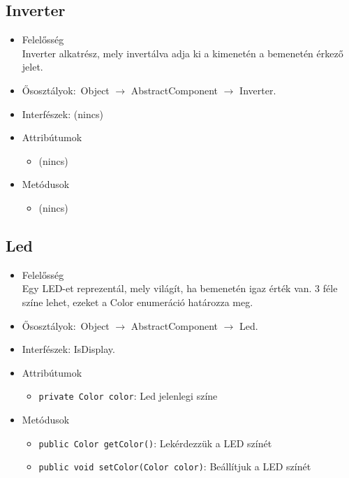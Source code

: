 \subsection{Inverter}
\begin{itemize}
\item Felelősség\\
Inverter alkatrész, mely invertálva adja ki a kimenetén a bemenetén  érkező jelet.
\item Ősosztályok:\ Object $\rightarrow{}$ AbstractComponent $\rightarrow{}$ Inverter.
\item Interfészek: (nincs)
\item Attribútumok $\ $
\begin{itemize}
\item (nincs)
\end{itemize}
\item Metódusok$\ $
\begin{itemize}
\item (nincs)
\end{itemize}
\end{itemize}

\subsection{Led}
\begin{itemize}
\item Felelősség\\
Egy LED-et reprezentál, mely világít, ha bemenetén igaz érték van.  3 féle színe lehet, ezeket a Color enumeráció határozza meg.
\item Ősosztályok:\ Object $\rightarrow{}$ AbstractComponent $\rightarrow{}$ Led.
\item Interfészek: IsDisplay.
\item Attribútumok $\ $
\begin{itemize}
	\item \texttt{private Color color}: Led jelenlegi színe
\end{itemize}
\item Metódusok$\ $
\begin{itemize}
	\item \texttt{public Color getColor()}: Lekérdezzük a LED színét
	\item \texttt{public void setColor(Color color)}: Beállítjuk a LED színét
\end{itemize}
\end{itemize}

